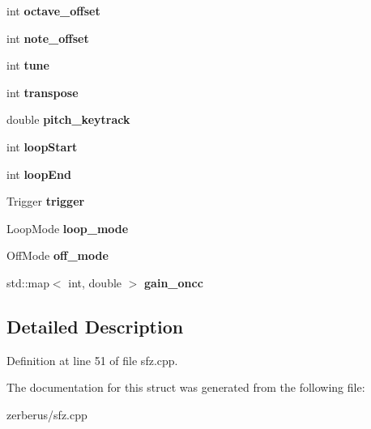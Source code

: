 \begin{DoxyCompactItemize}
\item 
\mbox{\label{struct_sfz_region_ab5b88592207eaeb27e19affcb2b72762}} 
int {\bfseries octave\+\_\+offset}
\item 
\mbox{\label{struct_sfz_region_af8ab10c7187d26705994f0466a2e2c01}} 
int {\bfseries note\+\_\+offset}
\item 
\mbox{\label{struct_sfz_region_aecdc80dabb63c299dff2452b8c2b1bd9}} 
int {\bfseries tune}
\item 
\mbox{\label{struct_sfz_region_a62cc393d57332b2bbde2846cc3033808}} 
int {\bfseries transpose}
\item 
\mbox{\label{struct_sfz_region_a1f0b5f3caa655b2a5910327de5d75f9e}} 
double {\bfseries pitch\+\_\+keytrack}
\item 
\mbox{\label{struct_sfz_region_a38c7645827e72f46c375fd465c0c9cdb}} 
int {\bfseries loop\+Start}
\item 
\mbox{\label{struct_sfz_region_a3cf0662767adf1e12417845bf8537872}} 
int {\bfseries loop\+End}
\item 
\mbox{\label{struct_sfz_region_a2aa3bdbd071745e84bd5de79727e149d}} 
Trigger {\bfseries trigger}
\item 
\mbox{\label{struct_sfz_region_ab8bf020d97bf00ccf1e9544f383b35c9}} 
Loop\+Mode {\bfseries loop\+\_\+mode}
\item 
\mbox{\label{struct_sfz_region_a27b445d1ea1fa525a2502ca40885d10a}} 
Off\+Mode {\bfseries off\+\_\+mode}
\item 
\mbox{\label{struct_sfz_region_ab103b3b90589bfbebf7795919d1fe78f}} 
std\+::map$<$ int, double $>$ {\bfseries gain\+\_\+oncc}
\end{DoxyCompactItemize}


\subsection{Detailed Description}


Definition at line 51 of file sfz.\+cpp.



The documentation for this struct was generated from the following file\+:\begin{DoxyCompactItemize}
\item 
zerberus/sfz.\+cpp\end{DoxyCompactItemize}
